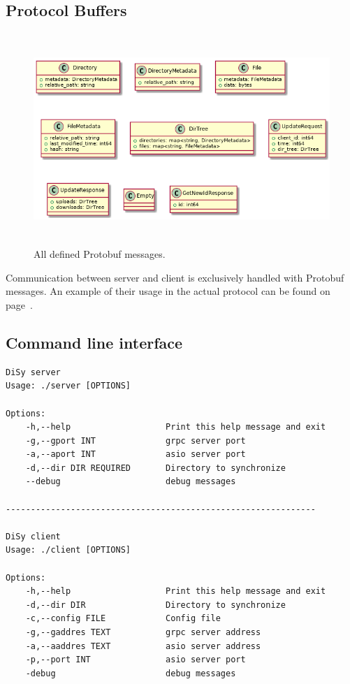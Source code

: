 \documentclass[a4paper]{article}
\begin{document}
\subsection{Protocol Buffers}
\begin{figure}[H]
\centering
\includegraphics[height=8cm]{protobufs}
\caption{All defined Protobuf messages.}
\end{figure}

Communication between server and client is exclusively handled with Protobuf messages. 
An example of their usage in the actual protocol can be found on page~\pageref{sec:phases}.
\newpage

\subsection{Command line interface}
\begin{verbatim}
DiSy server
Usage: ./server [OPTIONS]

Options:
    -h,--help                   Print this help message and exit
    -g,--gport INT              grpc server port
    -a,--aport INT              asio server port
    -d,--dir DIR REQUIRED       Directory to synchronize
    --debug                     debug messages

--------------------------------------------------------------

DiSy client
Usage: ./client [OPTIONS]

Options:
    -h,--help                   Print this help message and exit
    -d,--dir DIR                Directory to synchronize
    -c,--config FILE            Config file
    -g,--gaddres TEXT           grpc server address
    -a,--aaddres TEXT           asio server address
    -p,--port INT               asio server port
    -debug                      debug messages
\end{verbatim}
\end{document}
